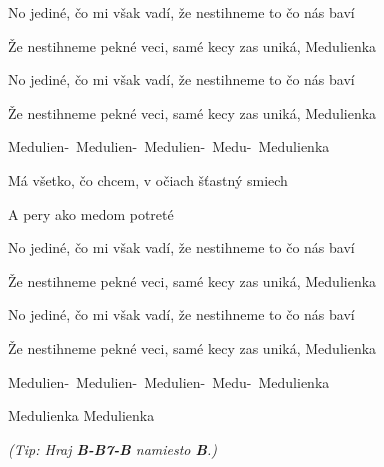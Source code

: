 \begin{song}
\bigskip

No jediné, čo mi však vadí, že nestihneme to čo nás baví \par
Že nestihneme pekné veci, samé kecy zas uniká, Medulienka \par
No jediné, čo mi však vadí, že nestihneme to čo nás baví \par
Že nestihneme pekné veci, samé kecy zas uniká, Medulienka \par
\mbox{Medulien- Medulien- Medulien- Medu- Medulienka } \par

\bigskip

 \par
{}Má všetko, čo chcem, v očiach šťastný smiech \par
A pery ako medom potreté  \par

\bigskip


No jediné, čo mi však vadí, že nestihneme to čo nás baví \par
Že nestihneme pekné veci, samé kecy zas uniká, Medulienka \par
No jediné, čo mi však vadí, že nestihneme to čo nás baví \par
Že nestihneme pekné veci, samé kecy zas uniká, Medulienka \par
\mbox{Medulien- Medulien- Medulien- Medu- Medulienka } \par
Medulienka  Medulienka  \par

\bigskip
\bigskip

{\smaller \it (Tip: Hraj \textbf{B-B7-B} namiesto \textbf{B}.)}

\end{song}
